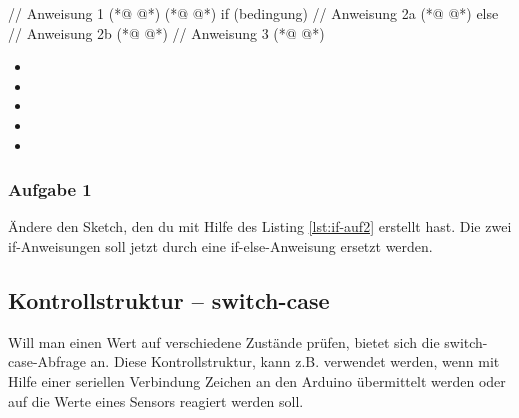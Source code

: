 \begin{multicols}{2}
\null\vfill 
\begin{arduinoCode}{}{}
// Anweisung 1 (*@  @*)
(*@  @*)
if (bedingung) {
  // Anweisung 2a (*@  @*)
} else {
  // Anweisung 2b (*@  @*)
}
// Anweisung 3 (*@  @*)
\end{arduinoCode}
\vfill\null 
\columnbreak

\begin{itemize}
  \itemsep15pt
  \item[] 
  \item[] 
  \item[] 
  \itemsep20pt
  \item[] 
  \itemsep15pt
  \item[] 
\end{itemize}
\vfill \null

\end{multicols}

\subsubsection{Aufgabe 1}

Ändere den Sketch, den du mit Hilfe des Listing \ref{lst:if-auf2} erstellt hast.  Die zwei if-Anweisungen soll jetzt durch eine if-else-Anweisung ersetzt werden. 

\clearpage
\subsection{Kontrollstruktur -- switch-case}

Will man einen Wert auf verschiedene Zustände prüfen, bietet sich die switch-case-Abfrage an. Diese Kontrollstruktur, kann z.B. verwendet werden, wenn mit Hilfe einer seriellen Verbindung Zeichen an den Arduino übermittelt werden oder auf die Werte eines Sensors reagiert werden soll.

